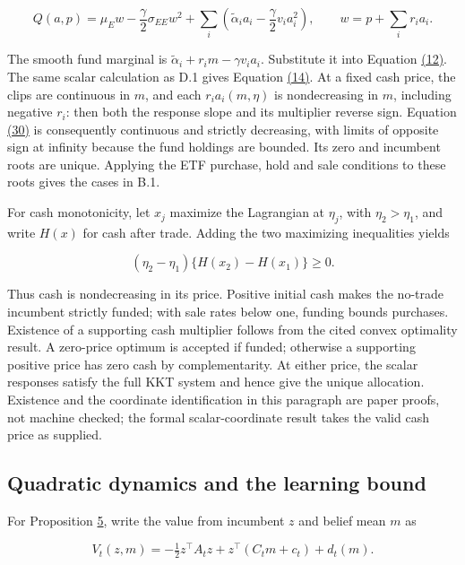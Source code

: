 \documentclass[11pt]{article}
\begin{document}
\begin{equation*}
Q(a,p)=\mu_E w-\frac\gamma2\sigma_{EE}w^2
+\sum_i\left(\tilde\alpha_i a_i-\frac\gamma2v_i a_i^2\right),
\qquad w=p+\sum_i r_i a_i.
\end{equation*}

The smooth fund marginal is \(\tilde\alpha_i+r_i m-\gamma v_i a_i\). Substitute it into Equation \hyperref[eq:12]{(12)}. The same scalar calculation as D.1 gives Equation \hyperref[eq:14]{(14)}. At a fixed cash price, the clips are continuous in \(m\), and each \(r_i a_i(m,\eta)\) is nondecreasing in \(m\), including negative \(r_i\): then both the response slope and its multiplier reverse sign. Equation \hyperref[eq:30]{(30)} is consequently continuous and strictly decreasing, with limits of opposite sign at infinity because the fund holdings are bounded. Its zero and incumbent roots are unique. Applying the ETF purchase, hold and sale conditions to these roots gives the cases in B.1.

For cash monotonicity, let \(x_j\) maximize the Lagrangian at \(\eta_j\), with \(\eta_2>\eta_1\), and write \(H(x)\) for cash after trade. Adding the two maximizing inequalities yields

\begin{equation*}
(\eta_2-\eta_1)\{H(x_2)-H(x_1)\}\geq0.
\end{equation*}

Thus cash is nondecreasing in its price. Positive initial cash makes the no-trade incumbent strictly funded; with sale rates below one, funding bounds purchases. Existence of a supporting cash multiplier follows from the cited convex optimality result. A zero-price optimum is accepted if funded; otherwise a supporting positive price has zero cash by complementarity. At either price, the scalar responses satisfy the full KKT system and hence give the unique allocation. Existence and the coordinate identification in this paragraph are paper proofs, not machine checked; the formal scalar-coordinate result takes the valid cash price as supplied.

\subsection{Quadratic dynamics and the learning bound}\label{sec:D.4}

For Proposition \hyperref[res:Proposition-5]{5}, write the value from incumbent \(z\) and belief mean \(m\) as

\begin{equation*}
V_t(z,m)=-\tfrac12 z^\top A_tz+z^\top(C_tm+c_t)+d_t(m).
\end{equation*}
\end{document}
